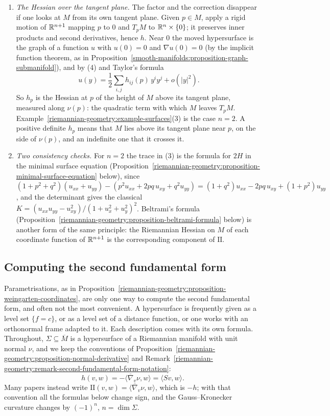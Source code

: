 \begin{remark}
\begin{enumerate}
\item \emph{The Hessian over the tangent plane.} The factor and the correction disappear if one looks at $M$ from its own tangent plane. Given $p \in M$, apply a rigid motion of $\mathbb{R}^{n+1}$ mapping $p$ to $0$ and
$T_pM$ to $\mathbb{R}^n \times \{0\}$; it preserves inner products and second derivatives, hence $h$. Near $0$ the moved hypersurface is the graph of a function $u$ with $u(0) = 0$ and $\nabla u(0) = 0$ (by the implicit
function theorem, as in Proposition~\ref{smooth-manifolds:proposition-graph-submanifold}), and by (4) and Taylor's formula
\[
u(y) = \frac12\sum_{i,j}h_{ij}(p)\,y^iy^j + o(|y|^2) .
\]
So $h_p$ is the Hessian at $p$ of the height of $M$ above its tangent plane, measured along $\nu(p)$: the quadratic term with which $M$ leaves $T_pM$. Example~\ref{riemannian-geometry:example-surfaces}(3) is the case
$n = 2$. A positive definite $h_p$ means that $M$ lies above its tangent plane near $p$, on the side of $\nu(p)$, and an indefinite one that it crosses it.
\item \emph{Two consistency checks.} For $n = 2$ the trace in (3) is the formula for $2H$ in the minimal surface equation (Proposition~\ref{riemannian-geometry:proposition-minimal-surface-equation} below), since
$(1 + p^2 + q^2)(u_{xx} + u_{yy}) - (p^2u_{xx} + 2pq\,u_{xy} + q^2u_{yy}) = (1 + q^2)u_{xx} - 2pq\,u_{xy} + (1 + p^2)u_{yy}$, and the determinant gives the classical
$K = (u_{xx}u_{yy} - u_{xy}^2)/(1 + u_x^2 + u_y^2)^2$. Beltrami's formula (Proposition~\ref{riemannian-geometry:proposition-beltrami-formula} below) is another form of the same principle: the Riemannian Hessian
on $M$ of each coordinate function of $\mathbb{R}^{n+1}$ is the corresponding component of $\mathrm{II}$.
\end{enumerate}
\end{remark}

\subsection{Computing the second fundamental form}\label{riemannian-geometry:subsection-computing-second-fundamental-form}

Parametrisations, as in Proposition~\ref{riemannian-geometry:proposition-weingarten-coordinates}, are only one way to compute the second fundamental form, and often not the most convenient. A hypersurface
is frequently given as a level set $\{f = c\}$, or as a level set of a distance function, or one works with an orthonormal frame adapted to it. Each description comes with its own formula. Throughout,
$\Sigma \subseteq \overline{M}$ is a hypersurface of a Riemannian manifold with unit normal $\nu$, and we keep the conventions of Proposition~\ref{riemannian-geometry:proposition-normal-derivative} and Remark~\ref{riemannian-geometry:remark-second-fundamental-form-notation}:
\[
h(v, w) = -\langle\overline{\nabla}_v\nu, w\rangle = \langle S v, w\rangle .
\]
Many papers instead write $\mathrm{II}(v, w) = \langle\overline{\nabla}_v\nu, w\rangle$, which is $-h$; with that convention all the formulas below change sign, and the Gauss--Kronecker curvature changes by
$(-1)^n$, $n = \dim\Sigma$.

